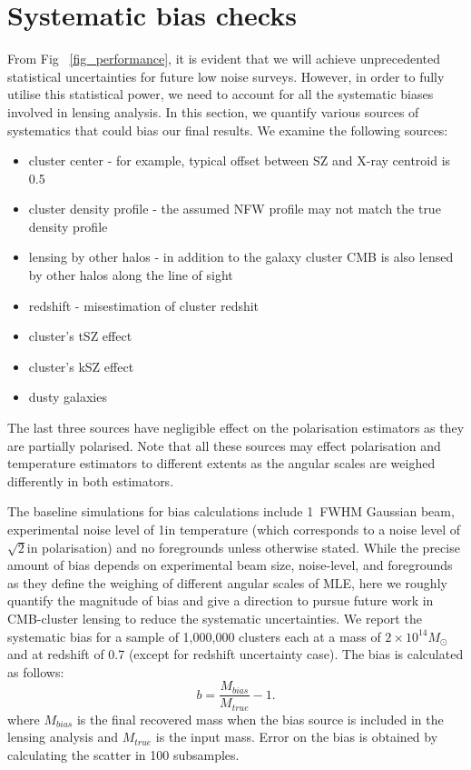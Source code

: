   \section{Systematic bias checks}
  \label{sys_bias}
  From Fig ~\ref{fig_performance}, it is evident that we will achieve unprecedented statistical uncertainties for future low noise surveys. 
  However, in order to fully utilise this statistical power, we need to account for all the systematic biases involved in lensing analysis. %
    In this section, we quantify various sources of systematics that could bias our final results.
    We examine the following sources:
    \begin{itemize}
    \item cluster center - for example, typical offset between SZ and X-ray centroid is 0.5 \am\ \citep{linden14}
    \item cluster density profile - the assumed NFW profile may not match the true density profile
    \item lensing by other halos - in addition to the galaxy cluster CMB is also lensed by other halos along the line of sight 
    \item redshift - misestimation of cluster redshit
    \item cluster's tSZ effect
    \item cluster's kSZ effect
    \item dusty galaxies
    \end{itemize}
    The last three sources have negligible effect on the polarisation estimators as they are partially polarised. 
    Note that all these sources may effect polarisation and temperature estimators to different extents as the angular scales are weighed differently in both estimators. %
     
 The baseline simulations for bias calculations include 1\am\ FWHM Gaussian beam, experimental noise level of 1\ukam in temperature (which corresponds to a noise level of $\sqrt{2}$\ukam in polarisation) and no foregrounds unless otherwise stated.
  While the precise amount of bias depends on experimental beam size, noise-level, and foregrounds as they define the weighing of different angular scales of MLE, here we roughly quantify the magnitude of bias and give a direction to pursue future work in CMB-cluster lensing to reduce the systematic uncertainties. 
   We report the systematic bias for a sample of 1,000,000 clusters each at a mass of $2 \times 10^{14}  M_{\odot}$ and at redshift of 0.7 (except for redshift uncertainty case). The bias is calculated as follows:
   \begin{equation}
   b = \frac{M_{bias}}{M_{true}} - 1.
   \end{equation}
   where $M_{bias}$ is the final recovered mass when the bias source is included in the lensing analysis and $M_{true}$ is the input mass. 
   Error on the bias is obtained by calculating the scatter in 100 subsamples.
   
